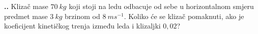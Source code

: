
\noindent 
\textbf{
\thecjelina.\thezadatak.}
Klizač mase $70\ kg$ koji stoji na ledu odbacuje od sebe u horizontalnom smjeru predmet mase $3\ kg$ brzinom od $8\ ms^{-1}$.
Koliko će se klizač pomaknuti, ako je koeficijent kinetičkog trenja između leda i klizaljki $0,02$?



